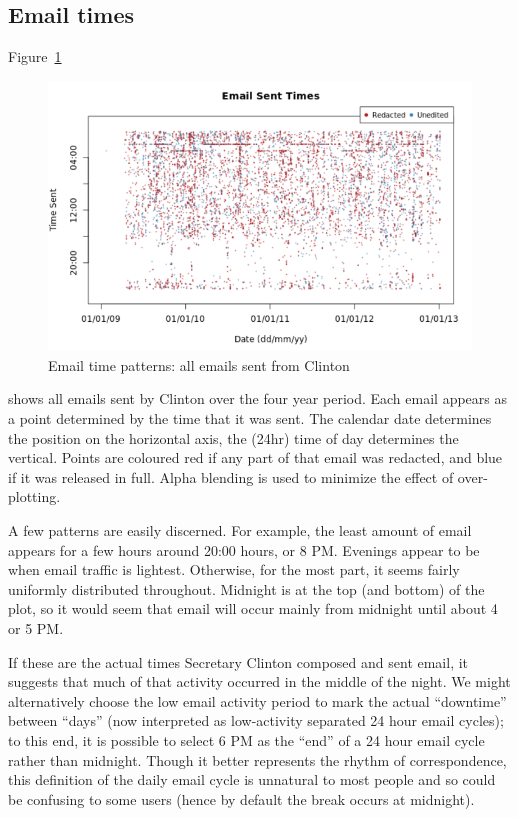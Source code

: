 \documentclass[journal]{vgtc}                %
\begin{document}
\subsection{Email times}
\label{sect:Displays:times}
Figure~\ref{fig:TimesAll}  
\begin{figure}[h]
\begin{center}
\includegraphics[width=0.95\linewidth]{DailyFullTimeFromClinton}
\caption{Email time patterns: all emails sent from Clinton}
\label{fig:TimesAll}
\end{center}
\end{figure}
shows all emails sent by Clinton over the four year period.  Each email appears as a point determined by the time that it was sent.  The calendar date determines the position on the horizontal axis,  the (24hr) time of day determines the vertical.   Points are coloured red if any part of that email was redacted, and blue if it was released in full.   Alpha blending is used to minimize the effect of over-plotting.
 
A few patterns are easily discerned.  For example, the least amount of email appears for a few hours around  20:00 hours, or 8 PM.  Evenings appear to be when email traffic is lightest.  Otherwise, for the most part, it seems fairly uniformly distributed throughout.  Midnight is at the top (and bottom) of the plot, so it would seem that email will occur mainly from midnight until about 4 or 5 PM.   

If these are the actual times Secretary Clinton composed and sent email, it suggests that much of that activity occurred in the middle of the night.  We might alternatively choose the low email activity period to mark the actual ``downtime'' between ``days'' (now interpreted as low-activity separated 24 hour email cycles);   to this end, it is possible to select 6 PM as the ``end'' of a 24 hour email cycle rather than midnight.   Though it better represents the rhythm of correspondence, this definition of the daily email cycle is unnatural to most people and so could be confusing to some users (hence by default the break occurs at midnight). 
\end{document}
